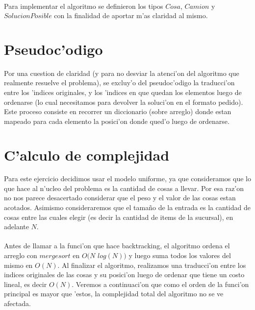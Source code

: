 \paragraph{}
Para implementar el algoritmo se definieron los tipos $Cosa$, $Camion$ y $SolucionPosible$ con la finalidad de aportar m'as claridad al mismo.

\newpage
\section{Pseudoc'odigo}


\paragraph{}
Por una cuestion de claridad (y para no desviar la atenci'on del algoritmo que realmente resuelve el problema), 
se excluy'o del pseudoc'odigo la traducci'on entre los 'indices originales, y los 'indices en que quedan los 
elementos luego de ordenarse (lo cual necesitamos para devolver la soluci'on en el formato pedido). Este proceso 
consiste en recorrer un diccionario (sobre arreglo) donde estan mapeado para cada elemento la posici'on donde 
qued'o luego de ordenarse.
 
\newpage
\section{C'alculo de complejidad}
\paragraph{}
Para este ejercicio decidimos usar el modelo uniforme, ya que consideramos que lo que hace al n'ucleo del problema es la
cantidad de cosas a llevar. Por esa raz'on no nos parece desacertado considerar que el peso y el valor de las cosas estan 
acotados. Asimismo consideraremos que el tama\~{n}o de la entrada es la cantidad de cosas entre las cuales elegir 
(es decir la cantidad de items de la sucursal), en adelante $N$.
\paragraph{}
Antes de llamar a la funci'on que hace backtracking, el algoritmo ordena el arreglo con $merge sort$ en 
$O(N$ $log(N))$ y luego suma todos los valores del mismo en $O(N)$. Al finalizar el algoritmo, realizamos 
una traducci'on entre los indices originales de las cosas y su posici'on luego de ordenar que tiene un costo 
lineal, es decir $O(N)$. Veremos a continuaci'on que como el orden de la funci'on principal es mayor que 'estos, 
la complejidad total del algoritmo no se ve afectada.
